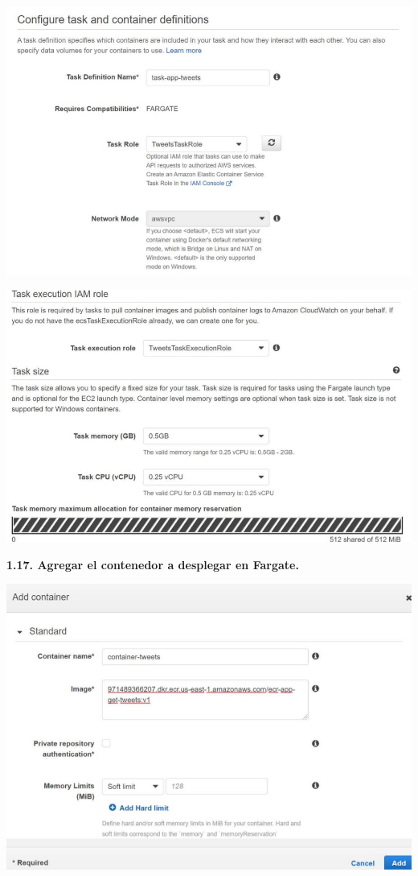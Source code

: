 \documentclass{article}
\begin{document}
    \begin{center}
		\includegraphics[width=15cm]{./images/17} 
	\end{center}
	   \begin{center}
		\includegraphics[width=15cm]{./images/18} 
	\end{center}
	
	
		\textbf{1.17.  Agregar el contenedor a desplegar en Fargate.
}

    \begin{center}
		\includegraphics[width=15cm]{./images/19} 
	\end{center}
	
\end{document}
